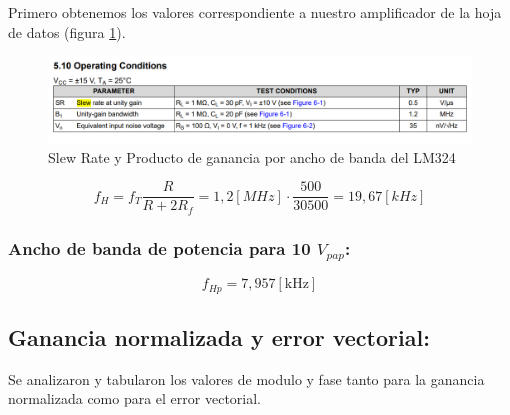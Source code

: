  Primero obtenemos los valores correspondiente a nuestro amplificador de la hoja de datos (figura \ref{fig:1a_slew_rate}).

\begin{figure}[h!]
    \centering
    \includegraphics[width=1\linewidth]{img/slewrate_bgw.png}
    \caption{Slew Rate y Producto de ganancia por ancho de banda del LM324}
    \label{fig:1a_slew_rate}
\end{figure}

\[ f_H = f_{T} \frac{R}{R+2 R_f} = 1,2 [MHz] \cdot \frac{500}{30500} = 19,67 [kHz] \]

\subsubsection{Ancho de banda de potencia para 10 \texorpdfstring{$V_{pap}$}{Vpap}:}
\[ f_{Hp}=7,957[\mathrm{kHz}] \]


  
 
\subsection { Ganancia normalizada y error vectorial:}
Se analizaron y tabularon los valores de modulo y fase tanto para la ganancia normalizada como para el error vectorial.

